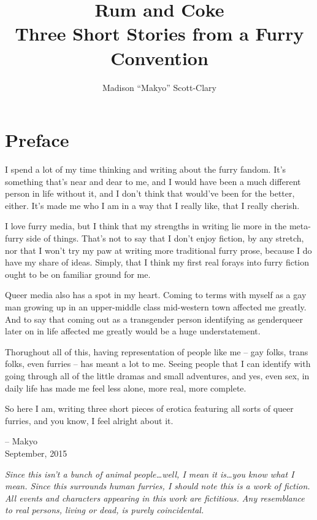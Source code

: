 \documentclass[12pt,letterpaper,oneside]{memoir}
\begin{document}
  \title{Rum and Coke\\Three Short Stories from a Furry Convention}
  \author{Madison ``Makyo'' Scott-Clary}
  \maketitle

  \newpage
  \tableofcontents

  \chapter*{Preface}

  I spend a lot of my time thinking and writing about the furry fandom.  It's something that's near and dear to me, and I would have been a much different person in life without it, and I don't think that would've been for the better, either.  It's made me who I am in a way that I really like, that I really cherish.

  I love furry media, but I think that my strengths in writing lie more in the meta-furry side of things.  That's not to say that I don't enjoy fiction, by any stretch, nor that I won't try my paw at writing more traditional furry prose, because I do have my share of ideas.  Simply, that I think my first real forays into furry fiction ought to be on familiar ground for me.

  Queer media also has a spot in my heart.  Coming to terms with myself as a gay man growing up in an upper-middle class mid-western town affected me greatly. And to say that coming out as a transgender person identifying as genderqueer later on in life affected me greatly would be a huge understatement.

  Thorughout all of this, having representation of people like me -- gay folks, trans folks, even furries -- has meant a lot to me.  Seeing people that I can identify with going through all of the little dramas and small adventures, and yes, even sex, in daily life has made me feel less alone, more real, more complete.

  So here I am, writing three short pieces of erotica featuring all sorts of queer furries, and you know, I feel alright about it.

  -- Makyo\\September, 2015

  \newpage
  \textit{Since this isn't a bunch of animal people\ldots{}well, I mean it is\ldots{}you know what I mean.  Since this surrounds human furries, I should note this is a work of fiction. All events and characters appearing in this work are fictitious. Any resemblance to real persons, living or dead, is purely coincidental.}
\end{document}
